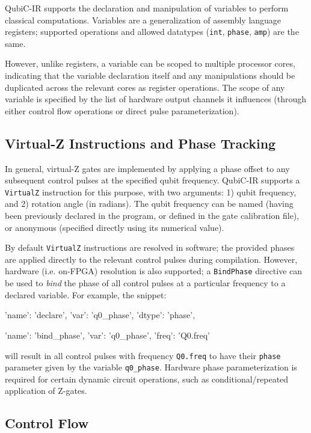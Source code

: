 \documentclass[journal]{IEEEtran}
\begin{document}
QubiC-IR supports the declaration and manipulation of variables to perform classical computations. Variables are a generalization of assembly language registers; supported operations and allowed datatypes (\verb|int|, \verb|phase|, \verb|amp|) are the same. 

However, unlike registers, a variable can be scoped to multiple processor cores, indicating that the variable declaration itself and any manipulations should be duplicated across the relevant cores as register operations. The scope of any variable is specified by the list of hardware output channels it influences (through either control flow operations or direct pulse parameterization). 

\subsection{Virtual-Z Instructions and Phase Tracking}

In general, virtual-Z gates are implemented by applying a phase offset to any subsequent control pulses at the specified qubit frequency. QubiC-IR supports a \verb|VirtualZ| instruction for this purpose, with two arguments: 1) qubit frequency, and 2) rotation angle (in radians). The qubit frequency can be named (having been previously declared in the program, or defined in the gate calibration file), or anonymous (specified directly using its numerical value).

By default \verb|VirtualZ| instructions are resolved in software; the provided phases are applied directly to the relevant control pulses during compilation. However, hardware (i.e. on-FPGA) resolution is also supported; a \verb|BindPhase| directive can be used to \textit{bind} the phase of all control pulses at a particular frequency to a declared variable. For example, the snippet:
\begin{python}
{'name': 'declare', 'var': 'q0_phase', 
    'dtype': 'phase'},
    
{'name': 'bind_phase', 'var': 'q0_phase', 
    'freq': 'Q0.freq'}
\end{python}
will result in all control pulses with frequency \verb|Q0.freq| to have their \verb|phase| parameter given by the variable \verb|q0_phase|. Hardware phase parameterization is required for certain dynamic circuit operations, such as conditional/repeated application of Z-gates.

\subsection{Control Flow}
\end{document}
